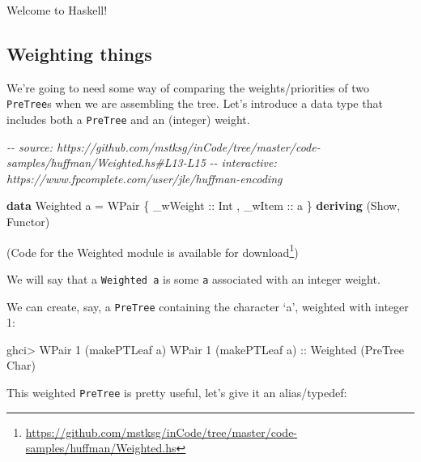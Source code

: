 \documentclass[]{article}
\newenvironment{Shaded}{}{}
\newcommand{\CharTok}[1]{\textcolor[rgb]{0.25,0.44,0.63}{#1}}
\newcommand{\CommentTok}[1]{\textcolor[rgb]{0.38,0.63,0.69}{\textit{#1}}}
\newcommand{\DataTypeTok}[1]{\textcolor[rgb]{0.56,0.13,0.00}{#1}}
\newcommand{\DecValTok}[1]{\textcolor[rgb]{0.25,0.63,0.44}{#1}}
\newcommand{\KeywordTok}[1]{\textcolor[rgb]{0.00,0.44,0.13}{\textbf{#1}}}
\newcommand{\NormalTok}[1]{#1}
\newcommand{\OperatorTok}[1]{\textcolor[rgb]{0.40,0.40,0.40}{#1}}
\newcommand{\OtherTok}[1]{\textcolor[rgb]{0.00,0.44,0.13}{#1}}
\renewcommand{\href}[2]{#2\footnote{\url{#1}}}
\begin{document}
Welcome to Haskell!

\hypertarget{weighting-things}{%
\subsection{Weighting things}\label{weighting-things}}

We're going to need some way of comparing the weights/priorities of two
\texttt{PreTree}s when we are assembling the tree. Let's introduce a data type
that includes both a \texttt{PreTree} and an (integer) weight.

\begin{Shaded}
\begin{Highlighting}[]
\CommentTok{{-}{-} source: https://github.com/mstksg/inCode/tree/master/code{-}samples/huffman/Weighted.hs\#L13{-}L15}
\CommentTok{{-}{-} interactive: https://www.fpcomplete.com/user/jle/huffman{-}encoding}

\KeywordTok{data} \DataTypeTok{Weighted}\NormalTok{ a }\OtherTok{=} \DataTypeTok{WPair}\NormalTok{ \{}\OtherTok{ \_wWeight ::} \DataTypeTok{Int}
\NormalTok{                        ,}\OtherTok{ \_wItem   ::}\NormalTok{ a}
\NormalTok{                        \} }\KeywordTok{deriving}\NormalTok{ (}\DataTypeTok{Show}\NormalTok{, }\DataTypeTok{Functor}\NormalTok{)}
\end{Highlighting}
\end{Shaded}

(Code for the Weighted module is
\href{https://github.com/mstksg/inCode/tree/master/code-samples/huffman/Weighted.hs}{available
for download})

We will say that a \texttt{Weighted\ a} is some \texttt{a} associated with an
integer weight.

We can create, say, a \texttt{PreTree} containing the character `a', weighted
with integer 1:

\begin{Shaded}
\begin{Highlighting}[]
\NormalTok{ghci}\OperatorTok{>} \DataTypeTok{WPair} \DecValTok{1}\NormalTok{ (makePTLeaf }\CharTok{\textquotesingle{}a\textquotesingle{}}\NormalTok{)}
\DataTypeTok{WPair} \DecValTok{1}\NormalTok{ (makePTLeaf }\CharTok{\textquotesingle{}a\textquotesingle{}}\NormalTok{)}\OtherTok{ ::} \DataTypeTok{Weighted}\NormalTok{ (}\DataTypeTok{PreTree} \DataTypeTok{Char}\NormalTok{)}
\end{Highlighting}
\end{Shaded}

This weighted \texttt{PreTree} is pretty useful, let's give it an alias/typedef:
\end{document}
